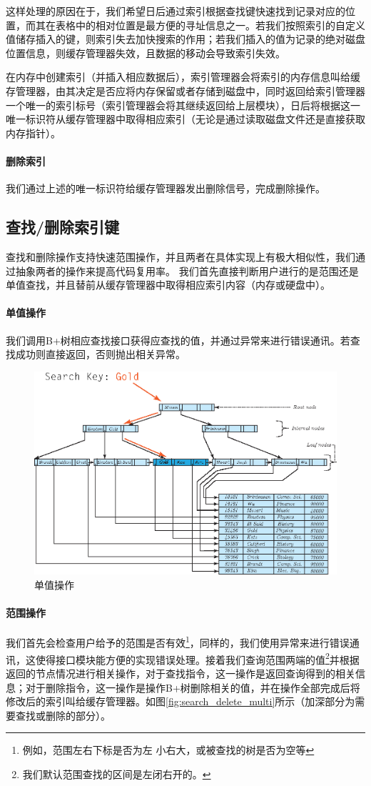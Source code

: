 \documentclass[UTF8]{ctexrep} %
\begin{document}
这样处理的原因在于，我们希望日后通过索引根据查找键快速找到记录对应的位置，而其在表格中的相对位置是最方便的寻址信息之一。若我们按照索引的自定义值储存插入的键，则索引失去加快搜索的作用；若我们插入的值为记录的绝对磁盘位置信息，则缓存管理器失效，且数据的移动会导致索引失效。
\par
在内存中创建索引（并插入相应数据后），索引管理器会将索引的内存信息叫给缓存管理器，由其决定是否应将内存保留或者存储到磁盘中，同时返回给索引管理器一个唯一的索引标号（索引管理器会将其继续返回给上层模块），日后将根据这一唯一标识符从缓存管理器中取得相应索引（无论是通过读取磁盘文件还是直接获取内存指针）。
\paragraph{删除索引}
我们通过上述的唯一标识符给缓存管理器发出删除信号，完成删除操作。

\subsection{查找/删除索引键}
查找和删除操作支持快速范围操作，并且两者在具体实现上有极大相似性，我们通过抽象两者的操作来提高代码复用率。
我们首先直接判断用户进行的是范围还是单值查找，并且替前从缓存管理器中取得相应索引内容（内存或硬盘中）。
\paragraph{单值操作}
我们调用B+树相应查找接口获得应查找的值，并通过异常来进行错误通讯。若查找成功则直接返回，否则抛出相关异常。
\begin{figure}[H]
    \centering
    \includegraphics[width=0.75\linewidth]{figure/search_delete_single.eps}
    \caption{单值操作}
    \label{fig:search_delete_single}
\end{figure}


\paragraph{范围操作}
我们首先会检查用户给予的范围是否有效\footnote{例如，范围左右下标是否为左 小右大，或被查找的树是否为空等}，同样的，我们使用异常来进行错误通讯，这使得接口模块能方便的实现错误处理。接着我们查询范围两端的值\footnote{我们默认范围查找的区间是左闭右开的。}并根据返回的节点情况进行相关操作，对于查找指令，这一操作是返回查询得到的相关信息；对于删除指令，这一操作是操作B+树删除相关的值，并在操作全部完成后将修改后的索引叫给缓存管理器。如图\ref{fig:search_delete_multi}所示（加深部分为需要查找或删除的部分）。
\end{document}

